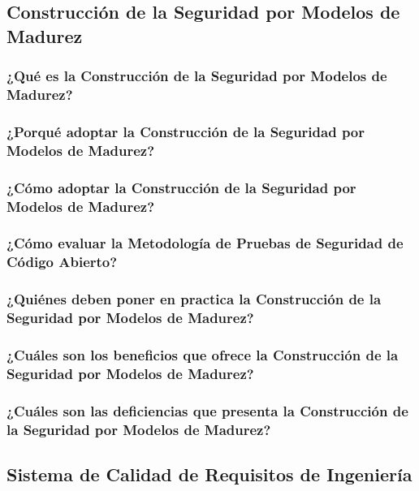 \documentclass[runningheads,a4paper]{llncs}
\begin{document}
\subsection{Construcción de la Seguridad por Modelos de Madurez}

\subsubsection{¿Qué es la Construcción de la Seguridad por Modelos de Madurez?}

\subsubsection{¿Porqué adoptar la Construcción de la Seguridad por Modelos de Madurez?}

\subsubsection{¿Cómo adoptar la Construcción de la Seguridad por Modelos de Madurez?}

\subsubsection{¿Cómo evaluar la Metodología de Pruebas de Seguridad de Código Abierto?}

\subsubsection{¿Quiénes deben poner en practica la Construcción de la Seguridad por Modelos de Madurez?}

\subsubsection{¿Cuáles son los beneficios que ofrece la Construcción de la Seguridad por Modelos de Madurez?}

\subsubsection{¿Cuáles son las deficiencias que presenta la Construcción de la Seguridad por Modelos de Madurez?}


\subsection{Sistema de Calidad de Requisitos de Ingeniería}
\end{document}
